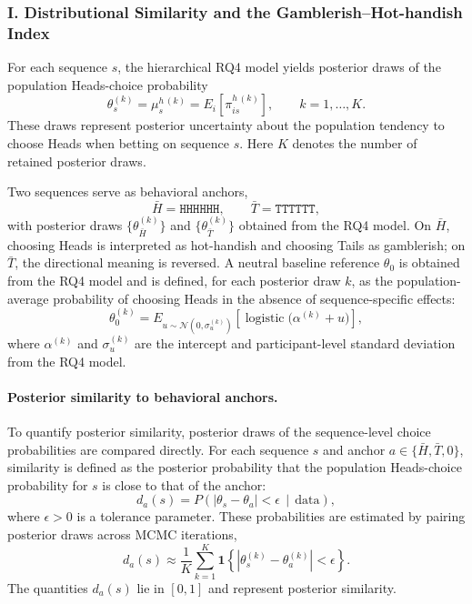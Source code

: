 \documentclass[11pt,a4paper]{article}
\numberwithin{equation}{section}
\begin{document}
\subsubsection*{I. Distributional Similarity and the Gamblerish--Hot-handish Index}
\label{Sec:Ex1.1}
For each sequence \(s\), the hierarchical RQ4 model yields posterior draws of the
population Heads-choice probability
\[
\theta_s^{(k)} = \mu_s^{h\,(k)} = E_i[\pi_{is}^{h\,(k)}],
\qquad k=1,\dots,K.
\]
These draws represent posterior uncertainty about the population tendency to
choose Heads when betting on sequence \(s\).
Here \(K\) denotes the number of retained posterior draws.

Two sequences serve as behavioral anchors,
\[
\bar{H} = \texttt{HHHHHH}, \qquad \bar{T} = \texttt{TTTTTT},
\]
with posterior draws \(\{\theta_{\bar{H}}^{(k)}\}\) and
\(\{\theta_{\bar{T}}^{(k)}\}\) obtained from the RQ4 model. On \(\bar{H}\),
choosing Heads is interpreted as hot-handish and choosing Tails as gamblerish; on
\(\bar{T}\), the directional meaning is reversed. A neutral baseline reference
\(\theta_0\) is obtained from the RQ4 model and is defined, for each posterior
draw \(k\), as the population-average probability of choosing Heads in the
absence of sequence-specific effects:
\[
\theta_0^{(k)}
= E_{u \sim \mathcal N(0,\sigma_u^{(k)})}
\!\left[\operatorname{logistic}\!\big(\alpha^{(k)} + u\big)\right],
\]
where \(\alpha^{(k)}\) and \(\sigma_u^{(k)}\) are the intercept and
participant-level standard deviation from the RQ4 model.

\paragraph{Posterior similarity to behavioral anchors.}
To quantify posterior similarity, posterior draws of the sequence-level choice
probabilities are compared directly. For each sequence \(s\) and anchor
\(a \in \{\bar{H}, \bar{T}, 0\}\), similarity is defined as the posterior
probability that the population Heads-choice probability for \(s\) is close to
that of the anchor:
\[
d_a(s)
= P\!\left( \left| \theta_s - \theta_a \right| < \epsilon \,\middle|\, \text{data} \right),
\]
where \(\epsilon > 0\) is a tolerance parameter. These probabilities are
estimated by pairing posterior draws across MCMC iterations,
\[
d_a(s)
\approx
\frac{1}{K} \sum_{k=1}^K
\mathbf{1}\!\left\{
\left| \theta_s^{(k)} - \theta_a^{(k)} \right| < \epsilon
\right\}.
\]
The quantities \(d_a(s)\) lie in \([0,1]\) and represent posterior similarity.
\end{document}

